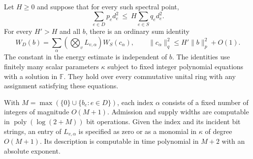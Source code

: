 \begin{theorem}
\label{thm:conversion}
Let $H\ge0$ and suppose that for every such spectral point,
\begin{equation}
 \sum_{e\in D}p_e d_e^2\ \le\ H\sum_{e\in S}q_e d_e^2 .
 \label{eq:motif-rayleigh}
\end{equation}
For every $H'>H$ and all $b$, there is an ordinary sum identity
\begin{equation}
 W_D(b)=\sum_\alpha
       \left(\bigotimes_v L_{v,\alpha}\right) W_S(c_\alpha),
 \qquad
 \|c_\alpha\|_q^2\le H'\|b\|_p^2+O(1).
 \label{eq:motif-conversion}
\end{equation}
The constant in the energy estimate is independent of $b$. The identities
use finitely many scalar parameters $\kappa$ subject to fixed integer
polynomial equations with a solution in $\mathbb F$. They hold over every
commutative unital ring with any assignment satisfying these equations.

With $M=\max(\{0\}\cup\{b_e:e\in D\})$, each index $\alpha$ consists of
a fixed number of integers of magnitude $O(M+1)$. Admission and supply
widths are computable in $\operatorname{poly}(\log(2+M))$ bit operations.
Given the index and its incident bit strings, an entry of $L_{v,\alpha}$
is specified as zero or as a monomial in $\kappa$ of degree $O(M+1)$.
Its description is computable in time polynomial in $M+2$ with an
absolute exponent.
\end{theorem}

